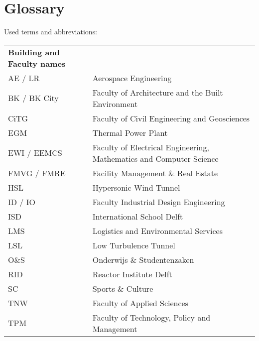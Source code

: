 \chapter{Glossary}
Used terms and abbreviations:
\begin{table}[H]
\label{my-label}
\begin{tabular}{ll}
\textbf{Building and Faculty names} &                                                                     \\
AE / LR                & Aerospace Engineering                                               \\
BK / BK City           & Faculty of Architecture and the Built Environment                   \\
CiTG                   & Faculty of Civil Engineering and Geosciences                        \\
EGM                    & Thermal Power Plant                                                 \\
EWI / EEMCS            & Faculty of Electrical Engineering, Mathematics and Computer Science \\
FMVG / FMRE            & Facility Management \& Real Estate                                  \\
HSL                    & Hypersonic Wind Tunnel                                              \\
ID / IO                & Faculty Industrial Design Engineering                               \\
ISD                    & International School Delft                                          \\
LMS                    & Logistics and Environmental Services                                \\
LSL                    & Low Turbulence Tunnel                                               \\
O\&S                   & Onderwijs \& Studentenzaken                                         \\
RID                    & Reactor Institute Delft                                             \\
SC                     & Sports \& Culture                                                   \\
TNW                    & Faculty of Applied Sciences                                         \\
TPM                    & Faculty of Technology, Policy and Management                        \\
\end{tabular}
\end{table}
